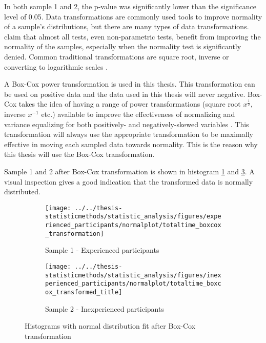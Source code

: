 In both sample 1 and 2, the p-value was significantly lower than the significance level of 0.05. Data transformations are commonly used tools to improve normality of a sample's distributions, but there are many types of data transformations. \cite{Osborne2010} claim that almost all tests, even non-parametric tests, benefit from improving the normality of the samples, especially when the normality test is significantly denied. Common traditional transformations are square root, inverse or converting to logarithmic scales  \citep{Osborne2010}. 

A Box-Cox power transformation is used in this thesis. This transformation can be used on positive data and the data used in this thesis will never negative. Box-Cox takes the idea of having a range of power transformations (square root $x^{\frac{1}{2}}$, inverse $x^{-1}$ etc.) available to improve the effectiveness of normalizing and variance equalizing for both positively- and negatively-skewed variables \citep{Osborne2010}. This transformation will always use the appropriate transformation to be maximally effective in moving each sampled data towards normality. This is the reason why this thesis will use the Box-Cox transformation.

Sample 1 and 2 after Box-Cox transformation is shown in histogram \ref{fig:totaltimeboxcoxtransformation_experienced} and \ref{fig:totaltimeboxcoxtransformedtitle_inexperienced}. A visual inspection gives a good indication that the transformed data is normally distributed.

\begin{figure}[H]
	\centering
	\begin{subfigure}[b]{0.48\textwidth}
		\centering
		\texttt{[image: ../../thesis-statisticmethods/statistic\_analysis/figures/experienced\_participants/normalplot/totaltime\_boxcox\_transformation]}
		\caption[Experienced, Box-Cox]{Sample 1 - Experienced participants}
		\label{fig:totaltimeboxcoxtransformation_experienced}
	\end{subfigure}
	\begin{subfigure}[b]{0.48\textwidth}
		\centering
		\texttt{[image: ../../thesis-statisticmethods/statistic\_analysis/figures/inexperienced\_participants/normalplot/totaltime\_boxcox\_transformed\_title]}
		\caption[Inexperienced, Box-Cox]{Sample 2 - Inexperienced participants}
		\label{fig:totaltimeboxcoxtransformedtitle_inexperienced}
	\end{subfigure}
\caption{Histograms with normal distribution fit after Box-Cox transformation}
\end{figure}

